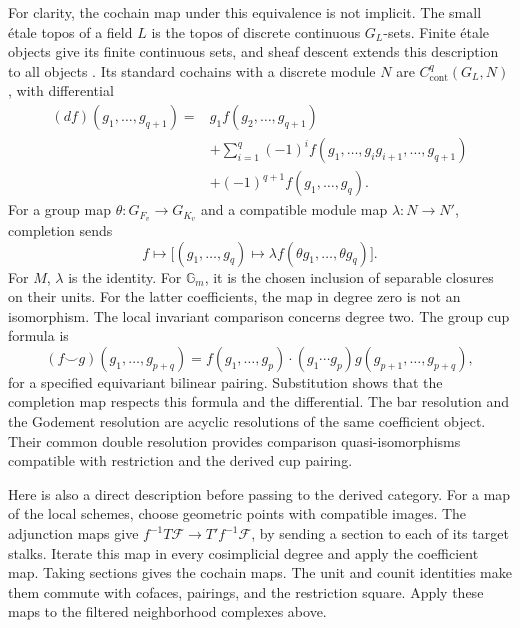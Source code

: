 For clarity, the cochain map under this equivalence is not implicit.
The small \'etale topos of a field \(L\) is the topos of discrete
continuous \(G_L\)-sets. Finite \'etale objects give its finite
continuous sets, and sheaf descent extends this description to all
objects \cite[Lemmas 59.59.1--59.59.2]{do27-Field}.
Its standard cochains with a discrete module \(N\) are
\(C^q_{\mathrm{cont}}(G_L,N)\), with differential
\[
\begin{split}
 (df)(g_1,\ldots,g_{q+1})={}&g_1f(g_2,\ldots,g_{q+1})\\
 &+\sum_{i=1}^q(-1)^if(g_1,\ldots,g_ig_{i+1},\ldots,g_{q+1})\\
 &+(-1)^{q+1}f(g_1,\ldots,g_q).
\end{split}
\]
For a group map \(\theta:G_{F_v}\to G_{K_v}\) and a compatible
module map \(\lambda:N\to N'\), completion sends
\[
 f\longmapsto\bigl[(g_1,\ldots,g_q)\mapsto
       \lambda f(\theta g_1,\ldots,\theta g_q)\bigr].
\]
For \(M\), \(\lambda\) is the identity. For \(\mathbb G_m\),
it is the chosen inclusion of separable closures on their units.
For the latter coefficients, the map in degree zero is not an
isomorphism. The local invariant comparison concerns degree two.
The group cup formula is
\[
 (f\smile g)(g_1,\ldots,g_{p+q})=
 f(g_1,\ldots,g_p)\cdot
 (g_1\cdots g_p)g(g_{p+1},\ldots,g_{p+q}),
\]
for a specified equivariant bilinear pairing. Substitution shows
that the completion map respects this formula and the differential.
The bar resolution and the Godement resolution are acyclic resolutions
of the same coefficient object. Their common double resolution
provides comparison quasi-isomorphisms compatible with restriction
and the derived cup pairing.

Here is also a direct description before passing to the derived
category. For a map of the local schemes, choose geometric points
with compatible images. The adjunction maps give
\(f^{-1}T\mathcal F\to T'f^{-1}\mathcal F\), by sending a section
to each of its target stalks. Iterate this map in every cosimplicial
degree and apply the coefficient map. Taking sections gives the
cochain maps. The unit and counit identities make them commute with
cofaces, pairings, and the restriction square. Apply these maps to
the filtered neighborhood complexes above.

